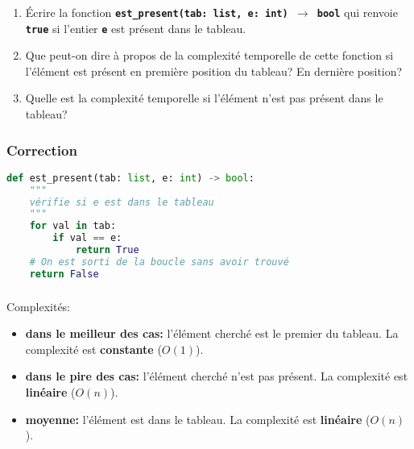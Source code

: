 \documentclass[svgnames,11pt]{beamer}
\begin{document}
\begin{frame}
    \frametitle{}

    \begin{activite}
        \begin{enumerate}
            \item Écrire la fonction \textbf{\texttt{est\_present(tab: list, e: int) $\rightarrow$ bool}} qui renvoie \textbf{\texttt{true}} si l'entier \textbf{\texttt{e}} est présent dans le tableau.
            \item Que peut-on dire à propos de la complexité temporelle de cette fonction si l'élément est présent en première position du tableau? En dernière position?
            \item Quelle est la complexité temporelle si l'élément n'est pas présent dans le tableau?
        \end{enumerate}
    \end{activite}

\end{frame}
\begin{frame}[fragile]
    \frametitle{Correction}
    \begin{center}
        \begin{lstlisting}[language=Python , basicstyle=\ttfamily\small, xleftmargin=2em, xrightmargin=2em]
def est_present(tab: list, e: int) -> bool:
    """
    vérifie si e est dans le tableau
    """
    for val in tab:
        if val == e:
            return True
    # On est sorti de la boucle sans avoir trouvé
    return False
\end{lstlisting}
    \end{center}


\end{frame}
\begin{frame}
    \frametitle{}

    \begin{center}
    \end{center}
    Complexités:
\begin{itemize}
    \item<1-> \textbf{dans le meilleur des cas:} l'élément cherché est le premier du tableau. La complexité est \textbf{constante} ($O(1)$).
    \item<2-> \textbf{dans le pire des cas:} l'élément cherché n'est pas présent. La complexité est \textbf{linéaire} ($O(n)$).
    \item<3-> \textbf{moyenne:} l'élément est dans le tableau. La complexité est \textbf{linéaire} ($O(n)$).
\end{itemize}
\end{frame}
\end{document}
